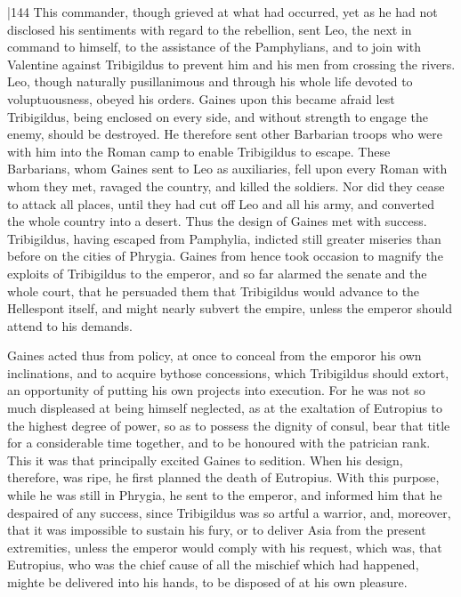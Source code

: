 |144 This commander, though grieved at what had occurred, yet as he had not disclosed his sentiments with regard to the rebellion, sent Leo, the next in command to himself, to the assistance of the Pamphylians, and to join with Valentine against Tribigildus to prevent him and his men from crossing the rivers. Leo, though naturally pusillanimous and through his whole life devoted to voluptuousness, obeyed his orders. Gaines upon this became afraid lest Tribigildus, being enclosed on every side, and without strength to engage the enemy, should be destroyed. He therefore sent other Barbarian troops who were with him into the Roman camp to enable Tribigildus to escape. These Barbarians, whom Gaines sent to Leo as auxiliaries, fell upon every Roman with whom they met, ravaged the country, and killed the soldiers. Nor did they cease to attack all places, until they had cut off Leo and all his army, and converted the whole country into a desert. Thus the design of Gaines met with success. Tribigildus, having escaped from Pamphylia, indicted still greater miseries than before on the cities of Phrygia. Gaines from hence took occasion to magnify the exploits of Tribigildus to the emperor, and so far alarmed the senate and the whole court, that he persuaded them that Tribigildus would advance to the Hellespont itself, and might nearly subvert the empire, unless the emperor should attend to his demands.

Gaines acted thus from policy, at once to conceal from the emporor his own inclinations, and to acquire by\emph{}those concessions, which Tribigildus should extort, an opportunity of putting his own projects into execution. For he was not so much displeased at being himself neglected, as at the exaltation of Eutropius to the highest degree of power, so as to possess the dignity of consul, bear that title for a considerable time together, and to be honoured with the patrician rank. This it was that principally excited Gaines to sedition. When his design, therefore, was ripe, he first planned the death of Eutropius. With this purpose, while he was still in Phrygia, he sent to the emperor, and informed him that he despaired of any success, since Tribigildus was so artful a warrior, and, moreover, that it was impossible to sustain his fury, or to deliver Asia from the present extremities, unless the emperor would comply with his request, which was, that Eutropius, who was the chief cause of all the mischief which had happened, mighte be delivered into his hands, to be disposed of at his own pleasure.

